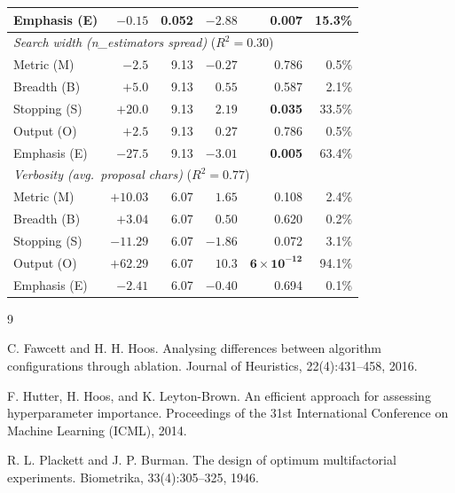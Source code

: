 \documentclass[11pt]{article}
\begin{document}
\begin{table}[htbp]
\begin{tabular}{lrrrr r}
\quad Emphasis (E)      & $-0.15$ & 0.052 & $-2.88$ & \textbf{0.007} & 15.3\% \\
\midrule
\multicolumn{6}{l}{\textit{Search width (n\_estimators spread)} \quad ($R^2=0.30$)}\\
\quad Metric (M)        & $-2.5$  & 9.13 & $-0.27$ & 0.786 & 0.5\% \\
\quad Breadth (B)       & $+5.0$  & 9.13 & $0.55$  & 0.587 & 2.1\% \\
\quad Stopping (S)      & $+20.0$ & 9.13 & $2.19$  & \textbf{0.035} & 33.5\% \\
\quad Output (O)        & $+2.5$  & 9.13 & $0.27$  & 0.786 & 0.5\% \\
\quad Emphasis (E)      & $-27.5$ & 9.13 & $-3.01$ & \textbf{0.005} & 63.4\% \\
\midrule
\multicolumn{6}{l}{\textit{Verbosity (avg.\ proposal chars)} \quad ($R^2=0.77$)}\\
\quad Metric (M)        & $+10.03$ & 6.07 & $1.65$  & 0.108 & 2.4\% \\
\quad Breadth (B)       & $+3.04$  & 6.07 & $0.50$  & 0.620 & 0.2\% \\
\quad Stopping (S)      & $-11.29$ & 6.07 & $-1.86$ & 0.072 & 3.1\% \\
\quad Output (O)        & $+62.29$ & 6.07 & $10.3$  & $\mathbf{6\times10^{-12}}$ & 94.1\% \\
\quad Emphasis (E)      & $-2.41$  & 6.07 & $-0.40$ & 0.694 & 0.1\% \\
\bottomrule
\end{tabular}
\end{table}



\begin{thebibliography}{9}

C. Fawcett and H. H. Hoos.
Analysing differences between algorithm configurations through ablation.
Journal of Heuristics, 22(4):431--458, 2016.

F. Hutter, H. Hoos, and K. Leyton-Brown.
An efficient approach for assessing hyperparameter importance.
Proceedings of the 31st International Conference on Machine Learning (ICML), 2014.

R. L. Plackett and J. P. Burman.
The design of optimum multifactorial experiments.
Biometrika, 33(4):305--325, 1946.

\end{thebibliography}
\end{document}
